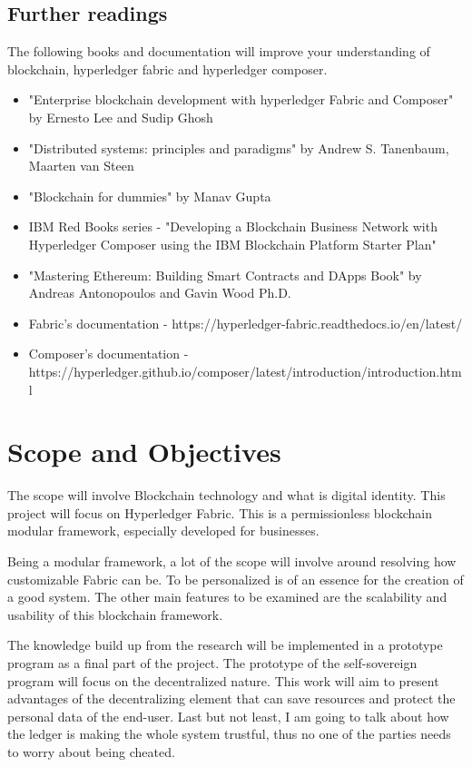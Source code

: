\documentclass[a4paper,11pt]{report}
\begin{document}
\subsection{Further readings}
The following books and documentation will improve your understanding of blockchain, hyperledger fabric and hyperledger composer.

\begin{itemize}
	\item "Enterprise blockchain development with hyperledger Fabric and Composer" by Ernesto Lee and Sudip Ghosh
	\item "Distributed systems: principles and paradigms" by Andrew S. Tanenbaum, Maarten van Steen
	\item "Blockchain for dummies" by Manav Gupta 
	\item IBM Red Books series - "Developing a Blockchain Business Network with Hyperledger Composer using the IBM Blockchain Platform Starter Plan" 
	\item "Mastering Ethereum: Building Smart Contracts and DApps Book" by Andreas Antonopoulos and Gavin Wood Ph.D.
	\item Fabric's documentation - https://hyperledger-fabric.readthedocs.io/en/latest/
	\item Composer's documentation - https://hyperledger.github.io/composer/latest/introduction/introduction.html
\end{itemize}
\section{Scope and Objectives}

\label{introduction-objectives}

The scope will involve Blockchain technology and what is digital identity. This project will focus on Hyperledger Fabric. This is a permissionless blockchain modular framework, especially developed for businesses.
 
Being a modular framework, a lot of the scope will involve around resolving how customizable Fabric can be. To be personalized is of an essence for the creation of a good system. The other main features to be examined are the scalability and usability of this blockchain framework.   

The knowledge build up from the research will be implemented in a prototype program as a final part of the project. The prototype of the self-sovereign program will focus on the decentralized nature. This work will aim to present advantages of the decentralizing element that can save resources and protect the personal data of the end-user. Last but not least, I am going to talk about how the ledger is making the whole system trustful, thus no one of the parties needs to worry about being cheated. 
 	
\end{document}
